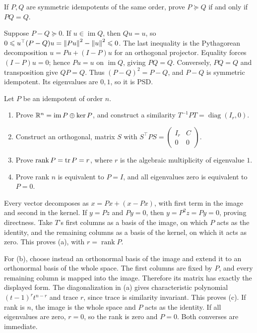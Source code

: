 \begin{problem}\label{ex:09:projector-order}
If \(P,Q\) are symmetric idempotents of the same order, prove
\(P\succeq Q\) if and only if \(PQ=Q\).
\end{problem}
\begin{solution}
Suppose \(P-Q\succeq0\). If \(u\in\operatorname{im}Q\), then \(Qu=u\),
so
\(0\leqslant u^\top(P-Q)u=\left\lVert Pu\right\rVert^2-\left\lVert u\right\rVert^2\leqslant0\).
The last inequality is the Pythagorean decomposition
\(u=Pu+(I-P)u\) for an orthogonal projector.
Equality forces \((I-P)u=0\); hence \(Pu=u\) on \(\operatorname{im}Q\),
giving \(PQ=Q\).
Conversely, \(PQ=Q\) and transposition give \(QP=Q\). Thus
\((P-Q)^2=P-Q\), and \(P-Q\) is symmetric idempotent.
Its eigenvalues are \(0,1\), so it is PSD.
\end{solution}

\begin{problem}\label{ex:09:idempotent-diagonal}
Let \(P\) be an idempotent of order \(n\).
\begin{enumerate}
\item Prove \(\mathbb R^n=\operatorname{im}P\oplus\ker P\), and construct a
similarity \(T^{-1}PT=\operatorname{diag}(I_r,0)\).
\item Construct an orthogonal, matrix \(S\) with
\(S^\top PS=\begin{pmatrix}I_r&C\\0&0\end{pmatrix}\).
\item Prove \(\operatorname{rank}P=\operatorname{tr} P=r\), where \(r\) is the
algebraic multiplicity of eigenvalue \(1\).
\item Prove rank \(n\) is equivalent to \(P=I\), and all eigenvalues
zero is equivalent to \(P=0\).
\end{enumerate}
\end{problem}
\begin{solution}
Every vector decomposes as
\(x=Px+(x-Px)\), with first term in the image and second in the kernel.
If \(y=Pz\) and \(Py=0\), then \(y=P^2z=Py=0\), proving directness.
Take \(T\)'s first columns as a basis of the image, on which \(P\)
acts as the identity, and the remaining columns as a basis of the kernel,
on which it acts as zero. This proves (a), with \(r=\operatorname{rank}P\).

For (b), choose instead an orthonormal basis of the image and extend it
to an orthonormal basis of the whole space. The first columns are fixed
by \(P\), and every remaining column is mapped into the image.
Therefore its matrix has exactly the displayed form.
The diagonalization in (a) gives characteristic polynomial
\((t-1)^r t^{n-r}\) and trace \(r\), since trace is similarity invariant.
This proves (c).
If rank is \(n\), the image is the whole space and \(P\) acts as the
identity. If all eigenvalues are zero, \(r=0\), so the rank is zero
and \(P=0\). Both converses are immediate.
\end{solution}

